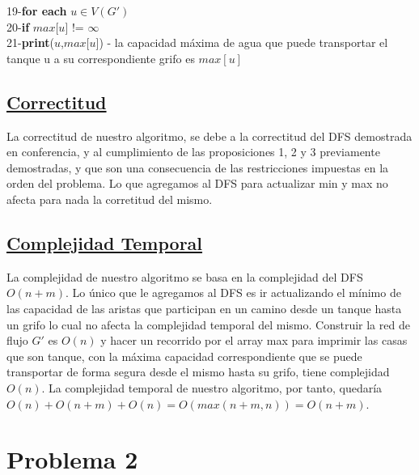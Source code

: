 \documentclass{article}
\begin{document}
\begin{algorithm}[H]
        19-\hspace*{1em}\textbf{for each} $u \in V(G')$\\
        20-\hspace*{2em}\textbf{if} $max$[$u$] != $\infty$\\
        21-\hspace*{3em}\textbf{print}($u$,$max$[$u$]) - la capacidad m\'axima de agua que puede transportar el tanque u a su correspondiente grifo es $max[u]$\\
        
    \end{algorithm}

    \subsection{\underline{Correctitud}}

    La correctitud de nuestro algoritmo, se debe a la correctitud del DFS demostrada en conferencia, y al cumplimiento de las proposiciones 
    1, 2 y 3 previamente demostradas, y que son una consecuencia de las restricciones impuestas en la orden del problema. Lo que
    agregamos al DFS para actualizar min y max no afecta para nada la corretitud del mismo.\\

    \subsection{\underline{Complejidad Temporal}}
    La complejidad de nuestro algoritmo se basa en la complejidad del DFS $O(n + m)$. Lo \'unico que le agregamos al DFS
    es ir actualizando  el m\'inimo de las capacidad de las aristas que participan en un camino desde un tanque hasta un 
    grifo lo cual no afecta la complejidad temporal del mismo. Construir la red de flujo $G'$ es $O(n)$ y hacer un recorrido por el array max
    para imprimir las casas que son tanque, con la m\'axima capacidad correspondiente que se puede transportar de forma segura 
    desde el mismo hasta su grifo, tiene complejidad $O(n)$. La complejidad temporal de nuestro algoritmo, por tanto, quedar\'ia $O(n) + O(n + m) + O(n) 
    = O(max(n + m, n)) = O(n + m)$.



    \newpage 

    \section{Problema 2} 
\end{document}
